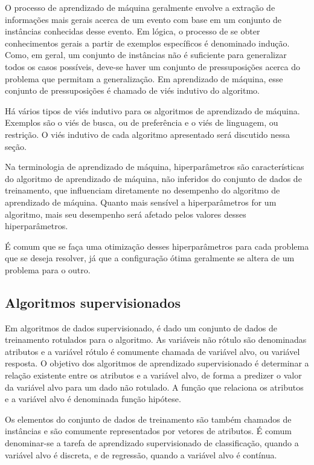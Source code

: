 \documentclass{article}
\begin{document}
O processo de aprendizado de máquina geralmente envolve a extração de informações mais gerais acerca de um evento com base em um conjunto de instâncias conhecidas desse evento. Em lógica, o processo de se obter conhecimentos gerais a partir de exemplos específicos é denominado indução. Como, em geral, um conjunto de instâncias não é suficiente para generalizar todos os casos possíveis, deve-se haver um conjunto de pressuposições acerca do problema que permitam a generalização. Em aprendizado de máquina, esse conjunto de pressuposições é chamado de viés indutivo do algoritmo.

Há vários tipos de viés indutivo para os algoritmos de aprendizado de máquina. Exemplos são o viés de busca, ou de preferência e o viés de linguagem, ou restrição. O viés indutivo de cada algoritmo apresentado será discutido nessa seção.

Na terminologia de aprendizado de máquina, hiperparâmetros são características do algoritmo de aprendizado de máquina, não inferidos do conjunto de dados de treinamento, que influenciam diretamente no desempenho do algoritmo de aprendizado de máquina. Quanto mais sensível a hiperparâmetros for um algoritmo, mais seu desempenho será afetado pelos valores desses hiperparâmetros.

É comum que se faça uma otimização desses hiperparâmetros para cada problema que se deseja resolver, já que a configuração ótima geralmente se altera de um problema para o outro.

\subsection{Algoritmos supervisionados}

Em algoritmos de dados supervisionado, é dado um conjunto de dados de treinamento rotulados para o algoritmo. As variáveis não rótulo são denominadas atributos e a variável rótulo é comumente chamada de variável alvo, ou variável resposta. O objetivo dos algoritmos de aprendizado supervisionado é determinar a relação existente entre os atributos e a variável alvo, de forma a predizer o valor da variável alvo para um dado não rotulado. A função que relaciona os atributos e a variável alvo é denominada função hipótese.

Os elementos do conjunto de dados de treinamento são também chamados de instâncias e são comumente representados por vetores de atributos. É comum denominar-se a tarefa de aprendizado supervisionado de classificação, quando a variável alvo é discreta, e de regressão, quando a variável alvo é contínua.
\end{document}
